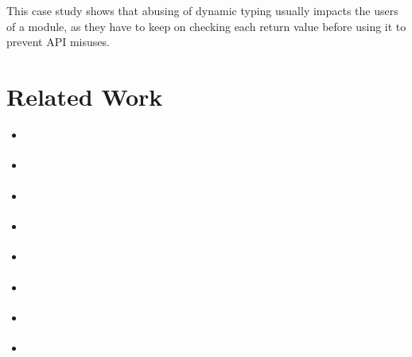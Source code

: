 This case study shows that abusing of dynamic typing usually impacts
the users of a module, as they have to keep on checking each return
value before using it to prevent API misuses.

\section{Related Work}

\begin{itemize}
\item \citep{tidallock}
\item \citep{bonnaire-sergeant2012typed-clojure}
\item \citep{vitousek2014deg}
\item \citep{allende2013gts}
\item \citep{tobin-hochstadt2008ts} 
\item \citep{dart}
\item \citep{typescript}
\item \citep{politz2012semantics}
\end{itemize}
